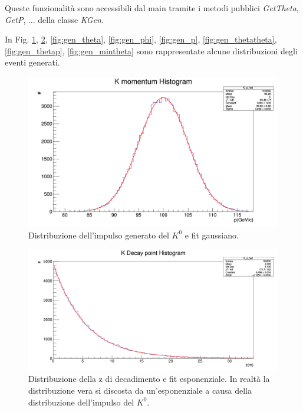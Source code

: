 \documentclass[8pt]{extarticle}
\begin{document}
Queste funzionalità sono accessibili dal main tramite i metodi pubblici \textit{GetTheta}, \textit{GetP}, ... della classe \textit{KGen}.

In Fig. \ref{fig:gen_pK}, \ref{fig:gen_z}, \ref{fig:gen_theta}, \ref{fig:gen_phi}, \ref{fig:gen_p}, \ref{fig:gen_thetatheta}, \ref{fig:gen_thetap}, \ref{fig:gen_mintheta} sono rappresentate alcune distribuzioni degli eventi generati.

\begin{figure}
	\begin{center}
		\includegraphics[scale=0.3]{gen_pK} 
		\caption{Distribuzione dell'impulso generato del $K^0$ e fit gaussiano.}
		\label{fig:gen_pK}
	\end{center}
\end{figure}

\begin{figure}
	\begin{center}
		\includegraphics[scale=0.3]{gen_z} 
		\caption{Distribuzione della z di decadimento e fit esponenziale. In realtà la distribuzione vera si discosta da un'esponenziale a causa della distribuzione dell'impulso del $K^0$.}
		\label{fig:gen_z}
	\end{center}
\end{figure}
\end{document}
